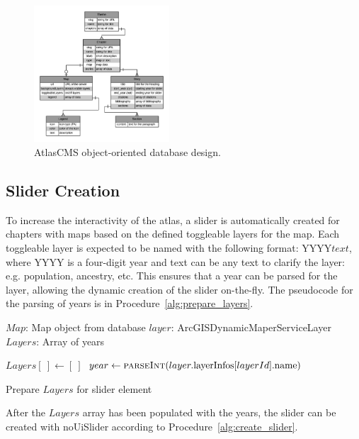 \documentclass[11pt, final, conference, twocolumn]{IEEEtran}
\begin{document}
\begin{figure}[h!]
	\centering
	\includegraphics[width=0.45\textwidth]{database_design}
	\caption{AtlasCMS object-oriented database design.}
	\label{fig:database_design}
\end{figure}

\subsection{Slider Creation}
\label{sec:slider_creation}
To increase the interactivity of the atlas, a slider is automatically created for chapters with maps based on the defined toggleable layers for the map. Each toggleable layer is expected to be named with the following format: YYYY$text$, where YYYY is a four-digit year and text can be any text to clarify the layer: e.g. population, ancestry, etc. This ensures that a year can be parsed for the layer, allowing the dynamic creation of the slider on-the-fly. The pseudocode for the parsing of years is in Procedure~\ref{alg:prepare_layers}.

\begin{algorithm}
	\begin{algorithmic}
		\Require $Map$: Map object from database
		\Require $layer$: ArcGISDynamicMaperServiceLayer
		\Ensure $Layers$: Array of years
		
		\State \State $Layers[\ ]\gets [\ ]$
			\State $year\gets \Call{parseInt}{layer.$layerInfos$[layerId].$name$}$
			\State {} 
		\EndFor
	\end{algorithmic}
	\caption{Prepare $Layers$ for slider element}
	\label{alg:prepare_layers}
\end{algorithm}

After the $Layers$ array has been populated with the years, the slider can be created with noUiSlider according to Procedure~\ref{alg:create_slider}.
\end{document}
